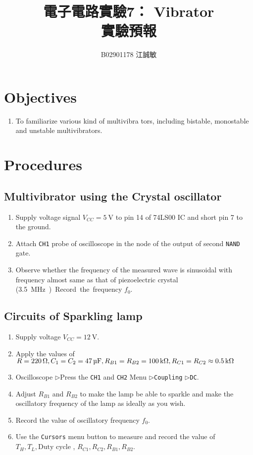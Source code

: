 \documentclass[12pt, a4paper]{article}
\title{ \bf {\huge 電子電路實驗7： Vibrator}\\ 實驗預報}
\author{B02901178 江誠敏}
\newcommand{\tri}{$\rhd$}
\begin{document}
\maketitle

\section{Objectives}
\begin{enumerate}
  \item To familiarize various kind of multivibra
    tors, including bistable, monostable and 
    unstable multivibrators. 
\end{enumerate}


\section{Procedures}
\subsection{Multivibrator using the Crystal oscillator}
\begin{enumerate}[itemsep=0pt]
  \item Supply voltage signal $V_{CC} = \SI{5}\V$ to pin 14 of 74LS00 IC and short
    pin 7 to the ground.
  \item Attach \texttt{CH1} probe of oscilloscope in the node of the output
    of second \texttt{NAND} gate.
  \item Observe whether the frequency of the measured wave is 
    sinusoidal with frequency almost same as that of 
    piezoelectric crystal (\SI{3.5}\MHz). Record the 
    frequency $f_0$.
\end{enumerate}

\subsection{Circuits of Sparkling lamp}
\begin{enumerate}[itemsep=0pt]
  \item Supply voltage $V_{CC} = \SI{12}\V$.
  \item Apply the values of $R = \SI{220}\ohm, C_1 = C_2 = \SI{47}\uF, 
    R_{B1} = R_{B2} = \SI{100}\kohm, R_{C1} = R_{C2} \approx \SI{0.5}\kohm$
  \item Oscilloscope \tri Press the \texttt{CH1} and \texttt{CH2} Menu
    \tri \texttt{Coupling} \tri \texttt{DC}.
  \item Adjust $R_{B1}$ and $R_{B2}$ to make the lamp be able
    to sparkle and make the oscillatory frequency of the lamp
    as ideally as you wish.
  \item Record the value of oscillatory frequency $f_0$.
  \item Use the \texttt{Cursors} menu button to measure
    and record the value of $T_H, T_L, \text{Duty cycle }$, 
    $R_{C1}, R_{C2}, R_{B1}, R_{B2}$.
\end{enumerate}
\end{document}
